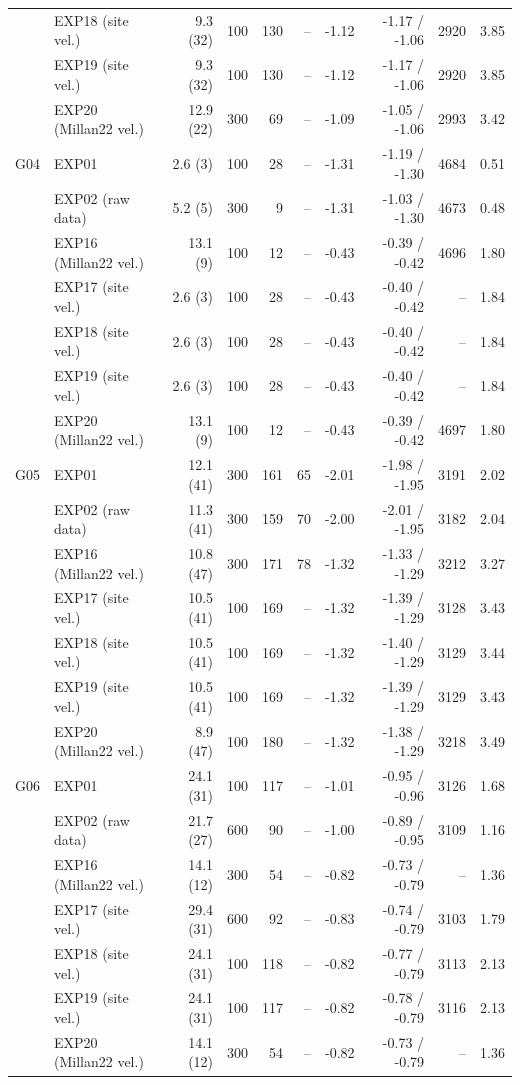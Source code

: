 \begin{tabular}{llrrrrrrrr}
 & EXP18 (site vel.) & 9.3 (32) & 100 & 130 & -- & -1.12 & -1.17 / -1.06 & 2920 & 3.85 \\
 & EXP19 (site vel.) & 9.3 (32) & 100 & 130 & -- & -1.12 & -1.17 / -1.06 & 2920 & 3.85 \\
 & EXP20 (Millan22 vel.) & 12.9 (22) & 300 & 69 & -- & -1.09 & -1.05 / -1.06 & 2993 & 3.42 \\
\midrule
G04 & EXP01 & 2.6 (3) & 100 & 28 & -- & -1.31 & -1.19 / -1.30 & 4684 & 0.51 \\
 & EXP02 (raw data) & 5.2 (5) & 300 & 9 & -- & -1.31 & -1.03 / -1.30 & 4673 & 0.48 \\
 & EXP16 (Millan22 vel.) & 13.1 (9) & 100 & 12 & -- & -0.43 & -0.39 / -0.42 & 4696 & 1.80 \\
 & EXP17 (site vel.) & 2.6 (3) & 100 & 28 & -- & -0.43 & -0.40 / -0.42 & -- & 1.84 \\
 & EXP18 (site vel.) & 2.6 (3) & 100 & 28 & -- & -0.43 & -0.40 / -0.42 & -- & 1.84 \\
 & EXP19 (site vel.) & 2.6 (3) & 100 & 28 & -- & -0.43 & -0.40 / -0.42 & -- & 1.84 \\
 & EXP20 (Millan22 vel.) & 13.1 (9) & 100 & 12 & -- & -0.43 & -0.39 / -0.42 & 4697 & 1.80 \\
\midrule
G05 & EXP01 & 12.1 (41) & 300 & 161 & 65 & -2.01 & -1.98 / -1.95 & 3191 & 2.02 \\
 & EXP02 (raw data) & 11.3 (41) & 300 & 159 & 70 & -2.00 & -2.01 / -1.95 & 3182 & 2.04 \\
 & EXP16 (Millan22 vel.) & 10.8 (47) & 300 & 171 & 78 & -1.32 & -1.33 / -1.29 & 3212 & 3.27 \\
 & EXP17 (site vel.) & 10.5 (41) & 100 & 169 & -- & -1.32 & -1.39 / -1.29 & 3128 & 3.43 \\
 & EXP18 (site vel.) & 10.5 (41) & 100 & 169 & -- & -1.32 & -1.40 / -1.29 & 3129 & 3.44 \\
 & EXP19 (site vel.) & 10.5 (41) & 100 & 169 & -- & -1.32 & -1.39 / -1.29 & 3129 & 3.43 \\
 & EXP20 (Millan22 vel.) & 8.9 (47) & 100 & 180 & -- & -1.32 & -1.38 / -1.29 & 3218 & 3.49 \\
\midrule
G06 & EXP01 & 24.1 (31) & 100 & 117 & -- & -1.01 & -0.95 / -0.96 & 3126 & 1.68 \\
 & EXP02 (raw data) & 21.7 (27) & 600 & 90 & -- & -1.00 & -0.89 / -0.95 & 3109 & 1.16 \\
 & EXP16 (Millan22 vel.) & 14.1 (12) & 300 & 54 & -- & -0.82 & -0.73 / -0.79 & -- & 1.36 \\
 & EXP17 (site vel.) & 29.4 (31) & 600 & 92 & -- & -0.83 & -0.74 / -0.79 & 3103 & 1.79 \\
 & EXP18 (site vel.) & 24.1 (31) & 100 & 118 & -- & -0.82 & -0.77 / -0.79 & 3113 & 2.13 \\
 & EXP19 (site vel.) & 24.1 (31) & 100 & 117 & -- & -0.82 & -0.78 / -0.79 & 3116 & 2.13 \\
 & EXP20 (Millan22 vel.) & 14.1 (12) & 300 & 54 & -- & -0.82 & -0.73 / -0.79 & -- & 1.36 \\
\bottomrule
\end{tabular}
